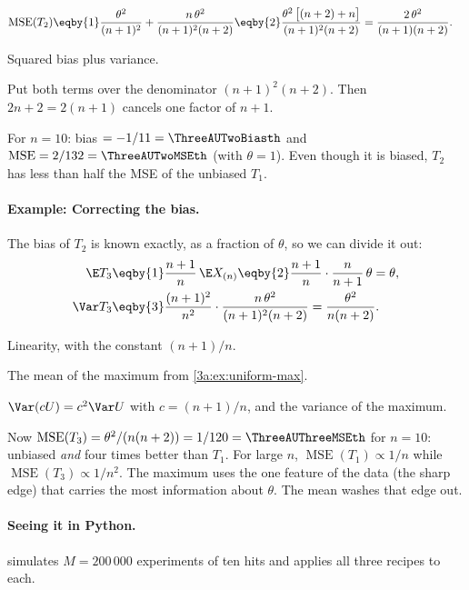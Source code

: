 \begin{align*}
  \operatorname{MSE}(T_2)
  &\eqby{1} \frac{\theta^2}{(n+1)^2}+\frac{n\,\theta^2}{(n+1)^2(n+2)}
   \eqby{2} \frac{\theta^2\,\bigl[(n+2)+n\bigr]}{(n+1)^2(n+2)}
   = \frac{2\,\theta^2}{(n+1)(n+2)} .
\end{align*}
\begin{explain}
  \item Squared bias plus variance.
  \item Put both terms over the denominator $(n+1)^2(n+2)$. Then
        $2n+2=2(n+1)$ cancels one factor of $n+1$.
\end{explain}
For $n=10$: bias $=-1/11=\ThreeAUTwoBiasth$ and
$\operatorname{MSE}=2/132=\ThreeAUTwoMSEth$ (with $\theta=1$). Even though it
is biased, $T_2$ has less than half the MSE of the unbiased $T_1$.

\paragraph{Example: Correcting the bias.}
\label{3a:ex:uniform-corrected}
The bias of $T_2$ is known exactly, as a fraction of $\theta$, so we can
divide it out:
\begin{align*}
  \E T_3 &\eqby{1} \frac{n+1}{n}\,\E X_{(n)} \eqby{2} \frac{n+1}{n}\cdot\frac{n}{n+1}\,\theta=\theta,\\
  \Var T_3 &\eqby{3} \frac{(n+1)^2}{n^2}\cdot\frac{n\,\theta^2}{(n+1)^2(n+2)}
   =\frac{\theta^2}{n(n+2)} .
\end{align*}
\begin{explain}
  \item Linearity, with the constant $(n+1)/n$.
  \item The mean of the maximum from \cref{3a:ex:uniform-max}.
  \item $\Var(cU)=c^2\Var U$ with $c=(n+1)/n$, and the variance of the maximum.
\end{explain}
Now $\operatorname{MSE}(T_3)=\theta^2/(n(n+2))=1/120=\ThreeAUThreeMSEth$ for
$n=10$: unbiased \emph{and} four times better than $T_1$. For large $n$,
$\operatorname{MSE}(T_1)\propto1/n$ while $\operatorname{MSE}(T_3)\propto1/n^2$.
The maximum uses the one feature of the data (the sharp edge) that carries
the most information about $\theta$. The mean washes that edge out.

\paragraph{Seeing it in Python.}
 simulates $M=200\,000$ experiments of ten hits and
applies all three recipes to each.

